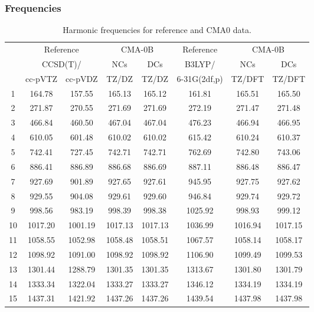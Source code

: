 \documentclass[10pt,oneside]{article}
\begin{document}
\subsubsection*{Frequencies}
\begin{table}[h!]
\centering
\caption{Harmonic frequencies for reference and CMA0 data.}
\begin{tabular}{cccccccc}
\toprule
{} & \multicolumn{2}{c}{Reference} & \multicolumn{2}{c}{CMA-0B} &    Reference & \multicolumn{2}{c}{CMA-0B} \\
{} & \multicolumn{2}{c}{CCSD(T)/} &     NCs &     DCs &       B3LYP/ &     NCs &     DCs \\
{} &   cc-pVTZ & cc-pVDZ &   TZ/DZ &   TZ/DZ & 6-31G(2df,p) &  TZ/DFT &  TZ/DFT \\
\midrule
1  &    164.78 &  157.55 &  165.13 &  165.12 &       161.81 &  165.51 &  165.50 \\
2  &    271.87 &  270.55 &  271.69 &  271.69 &       272.19 &  271.47 &  271.48 \\
3  &    466.84 &  460.50 &  467.04 &  467.04 &       476.23 &  466.94 &  466.95 \\
4  &    610.05 &  601.48 &  610.02 &  610.02 &       615.42 &  610.24 &  610.37 \\
5  &    742.41 &  727.45 &  742.71 &  742.71 &       762.69 &  742.80 &  743.06 \\
6  &    886.41 &  886.89 &  886.68 &  886.69 &       887.11 &  886.48 &  886.47 \\
7  &    927.69 &  901.89 &  927.65 &  927.61 &       945.95 &  927.75 &  927.62 \\
8  &    929.55 &  904.08 &  929.61 &  929.60 &       946.84 &  929.74 &  929.72 \\
9  &    998.56 &  983.19 &  998.39 &  998.38 &      1025.92 &  998.93 &  999.12 \\
10 &   1017.20 & 1001.19 & 1017.13 & 1017.13 &      1036.99 & 1016.94 & 1017.15 \\
11 &   1058.55 & 1052.98 & 1058.48 & 1058.51 &      1067.57 & 1058.14 & 1058.17 \\
12 &   1098.92 & 1091.00 & 1098.92 & 1098.92 &      1106.90 & 1099.49 & 1099.53 \\
13 &   1301.44 & 1288.79 & 1301.35 & 1301.35 &      1313.67 & 1301.80 & 1301.79 \\
14 &   1333.34 & 1322.04 & 1333.27 & 1333.27 &      1346.12 & 1334.19 & 1334.19 \\
15 &   1437.31 & 1421.92 & 1437.26 & 1437.26 &      1439.54 & 1437.98 & 1437.98 \\

\end{tabular}
\end{table}
\end{document}
